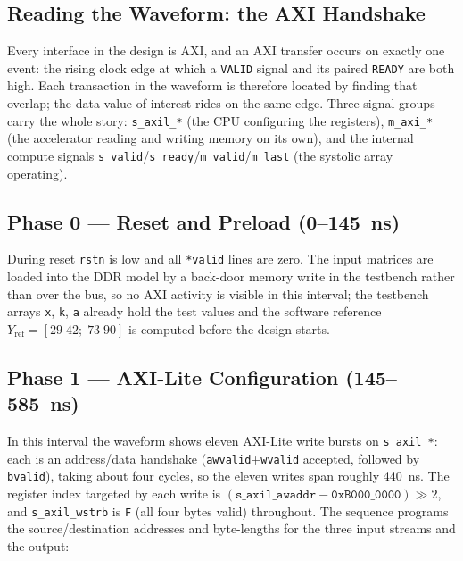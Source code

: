 \subsection{Reading the Waveform: the AXI Handshake}

Every interface in the design is AXI, and an AXI transfer occurs on exactly one
event: the rising clock edge at which a \texttt{VALID} signal and its paired
\texttt{READY} are both high. Each transaction in the waveform is therefore
located by finding that overlap; the data value of interest rides on the same
edge. Three signal groups carry the whole story: \texttt{s\_axil\_*} (the CPU
configuring the registers), \texttt{m\_axi\_*} (the accelerator reading and
writing memory on its own), and the internal compute signals
\texttt{s\_valid}/\texttt{s\_ready}/\texttt{m\_valid}/\texttt{m\_last} (the
systolic array operating).

\subsection{Phase 0 --- Reset and Preload (0--\SI{145}{ns})}

During reset \texttt{rstn} is low and all \texttt{*valid} lines are zero. The
input matrices are loaded into the DDR model by a back-door memory write in the
testbench rather than over the bus, so no AXI activity is visible in this
interval; the testbench arrays \texttt{x}, \texttt{k}, \texttt{a} already hold
the test values and the software reference $Y_\text{ref}=[29\;42;\;73\;90]$ is
computed before the design starts.

\subsection{Phase 1 --- AXI-Lite Configuration (\SI{145}{}--\SI{585}{ns})}

In this interval the waveform shows eleven AXI-Lite write bursts on
\texttt{s\_axil\_*}: each is an address/data handshake
(\texttt{awvalid}+\texttt{wvalid} accepted, followed by \texttt{bvalid}),
taking about four cycles, so the eleven writes span roughly \SI{440}{ns}. The
register index targeted by each write is
$(\texttt{s\_axil\_awaddr}-\texttt{0xB000\_0000})\gg 2$, and
\texttt{s\_axil\_wstrb} is \texttt{F} (all four bytes valid) throughout. The
sequence programs the source/destination addresses and byte-lengths for the
three input streams and the output:

